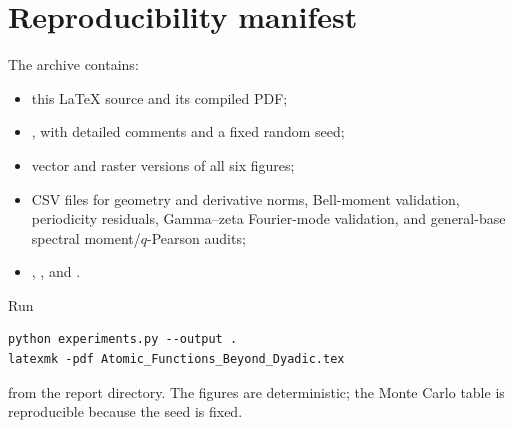 \documentclass[11pt,oneside]{article}
\theoremstyle{definition}
\theoremstyle{remark}
\begin{document}
\section{Reproducibility manifest}
\label{app:reproducibility}

The archive contains:
\begin{itemize}
\item this LaTeX source and its compiled PDF;
\item {}, with detailed comments and a fixed random seed;
\item vector and raster versions of all six figures;
\item CSV files for geometry and derivative norms, Bell-moment validation, periodicity residuals,
      Gamma--zeta Fourier-mode validation, and general-base spectral moment/$q$-Pearson audits;
\item {}, , and .
\end{itemize}
Run
\begin{lstlisting}[style=pseudo]
python experiments.py --output .
latexmk -pdf Atomic_Functions_Beyond_Dyadic.tex
\end{lstlisting}
from the report directory.  The figures are deterministic; the Monte Carlo table is
reproducible because the seed is fixed.
\end{document}
